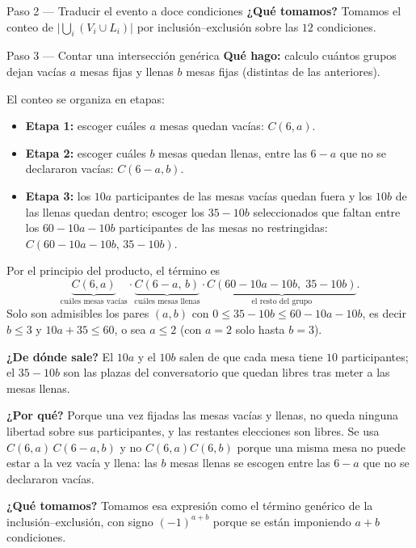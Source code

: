 \documentclass[11pt]{article}
\begin{document}
\begin{sol}
\begin{paso}{Paso 2 --- Traducir el evento a doce condiciones}
\textbf{¿Qu\'e tomamos?} Tomamos el conteo de $\big|\bigcup_i(V_i\cup L_i)\big|$ por inclusi\'on--exclusi\'on sobre las $12$ condiciones.
\end{paso}

\begin{paso}{Paso 3 --- Contar una intersecci\'on gen\'erica}
\textbf{Qu\'e hago:} calculo cu\'antos grupos dejan vac\'ias $a$ mesas fijas y llenas $b$ mesas fijas (distintas de las anteriores).

El conteo se organiza en etapas:
\begin{itemize}[leftmargin=*]
  \item \textbf{Etapa 1:} escoger cu\'ales $a$ mesas quedan vac\'ias: $C(6,a)$.
  \item \textbf{Etapa 2:} escoger cu\'ales $b$ mesas quedan llenas, entre las $6-a$ que no se declararon vac\'ias: $C(6-a,b)$.
  \item \textbf{Etapa 3:} los $10a$ participantes de las mesas vac\'ias quedan fuera y los $10b$ de las llenas quedan dentro; escoger los $35-10b$ seleccionados que faltan entre los $60-10a-10b$ participantes de las mesas no restringidas: $C(60-10a-10b,\,35-10b)$.
\end{itemize}
Por el principio del producto, el t\'ermino es
\[
\underbrace{C(6,a)}_{\text{cu\'ales mesas vac\'ias}}\cdot\underbrace{C(6-a,\,b)}_{\text{cu\'ales mesas llenas}}\cdot\underbrace{C(60-10a-10b,\;35-10b)}_{\text{el resto del grupo}} .
\]
Solo son admisibles los pares $(a,b)$ con $0\le 35-10b\le 60-10a-10b$, es decir $b\le 3$ y $10a+35\le 60$, o sea $a\le 2$ (con $a=2$ solo hasta $b=3$).

\textbf{¿De d\'onde sale?} El $10a$ y el $10b$ salen de que cada mesa tiene $10$ participantes; el $35-10b$ son las plazas del conversatorio que quedan libres tras meter a las mesas llenas.

\textbf{¿Por qu\'e?} Porque una vez fijadas las mesas vac\'ias y llenas, no queda ninguna libertad sobre sus participantes, y las restantes elecciones son libres. Se usa $C(6,a)\,C(6-a,b)$ y no $C(6,a)C(6,b)$ porque una misma mesa no puede estar a la vez vac\'ia y llena: las $b$ mesas llenas se escogen entre las $6-a$ que no se declararon vac\'ias.

\textbf{¿Qu\'e tomamos?} Tomamos esa expresi\'on como el t\'ermino gen\'erico de la inclusi\'on--exclusi\'on, con signo $(-1)^{a+b}$ porque se est\'an imponiendo $a+b$ condiciones.
\end{paso}


\end{sol}
\end{document}
